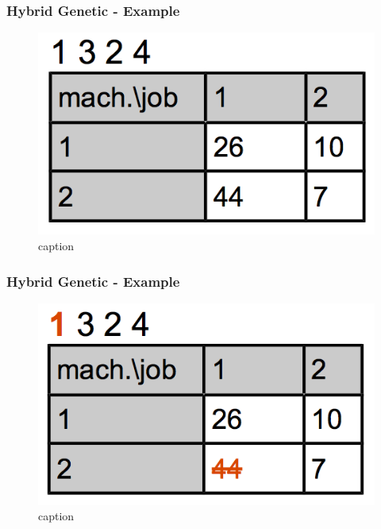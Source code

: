 \begin{frame}
  \frametitle{Hybrid Genetic - Example}

	
\begin{figure}[htbp]
	\centering
		\includegraphics[scale=1]{images/hyb0.png}
	\caption{caption}
	\label{fig:label}
\end{figure}
	
 
\end{frame}
\begin{frame}
  \frametitle{Hybrid Genetic - Example}

\begin{figure}[htbp]
	\centering
		\includegraphics[scale=1]{images/hyb1.png}
	\caption{caption}
	\label{fig:label}
\end{figure}
	
 
\end{frame}
